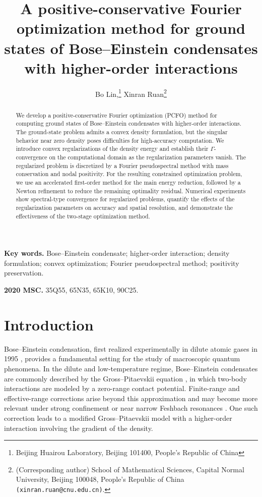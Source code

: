 \documentclass[11pt]{article}
\title{\bf
A positive-conservative Fourier optimization method for ground states of Bose--Einstein condensates with higher-order interactions
}
\author{
Bo Lin,\thanks{Beijing Huairou Laboratory, Beijing 101400,  People's Republic of China} \quad
Xinran Ruan\thanks{(Corresponding author) School of Mathematical Sciences, Capital Normal University, Beijing 100048, People's Republic of China {\tt (xinran.ruan@cnu.edu.cn)}.}
}
\date{}
\theoremstyle{plain}
\theoremstyle{definition}
\numberwithin{equation}{section}
\begin{document}
\maketitle

\begin{abstract}
We develop a positive-conservative Fourier optimization (PCFO) method
for computing ground states of Bose--Einstein condensates with
higher-order interactions. The ground-state problem admits a convex
density formulation, but the singular behavior near zero density
poses difficulties for high-accuracy computation. We introduce
convex regularizations of the density energy and establish their
$\Gamma$-convergence on the computational domain as the regularization
parameters vanish. The regularized problem is discretized by a
Fourier pseudospectral method with mass conservation and nodal
positivity. 
For the resulting constrained optimization problem, we use an accelerated
first-order method for the main energy reduction, followed by a Newton
refinement to reduce the remaining optimality residual. 
Numerical experiments show spectral-type convergence
for regularized problems, quantify the effects of the
regularization parameters on accuracy and spatial resolution, and
demonstrate the effectiveness of the two-stage optimization method.
\end{abstract}

\noindent
\textbf{Key words.}
Bose--Einstein condensate; higher-order interaction; density
formulation; convex optimization; Fourier
pseudospectral method; positivity preservation. 

\medskip

\noindent
\textbf{2020 MSC.}
35Q55, 65N35, 65K10, 90C25.


\section{Introduction}

Bose--Einstein condensation, first realized experimentally in dilute
atomic gases in 1995 \cite{Anderson1995}, provides a fundamental
setting for the study of macroscopic quantum phenomena. 
In the dilute and low-temperature regime, Bose--Einstein condensates are commonly
described by the Gross--Pitaevskii equation \cite{BaoCaiReview}, in
which two-body interactions are modeled by a zero-range contact
potential. Finite-range and effective-range corrections arise beyond
this approximation
\cite{CollinMassignanPethick2007,FuWangGao2003} and may become more
relevant under strong confinement or near narrow Feshbach resonances
\cite{Chin2010,VekslerFishmanKetterle2014,ZinnerThogersen2009}.
One such correction leads to a modified Gross--Pitaevskii model with
a higher-order interaction involving the gradient of the density.
\end{document}
